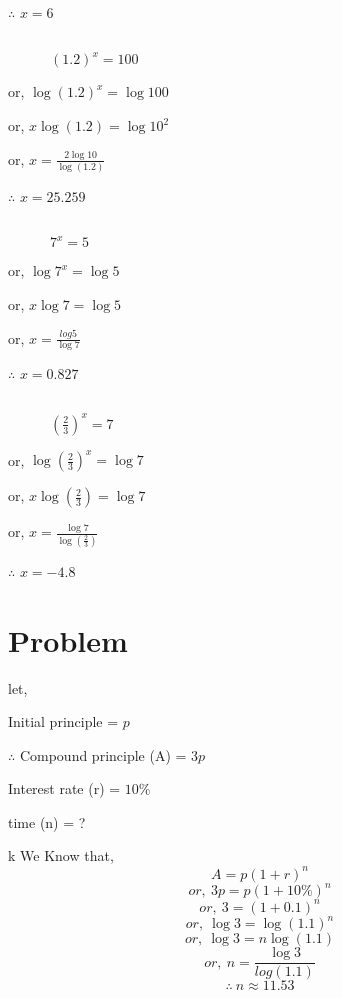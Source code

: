 \documentclass{report}
\begin{document}
$\therefore$ $x =6$

\subsection{}
$\quad\quad\quad\left(1.2\right)^x = 100$

or, $\log \left(1.2\right)^x = \log100$

or, $x\log \left(1.2\right) = \log 10^2$

or, $x = \frac{2\log10}{\log\left(1.2\right)}$

$\therefore$ $x =25.259$

\subsection{}
$\quad\quad\quad7^x = 5$

or, $\log 7^x = \log5$

or, $x\log 7 = \log 5$

or, $x = \frac{log5}{\log7}$

$\therefore$ $x =0.827$

\subsection{}
$\quad\quad\quad\left(\frac{2}{3}\right)^x = 7$

or, $\log \left(\frac{2}{3}\right)^x = \log7$

or, $x\log \left(\frac{2}{3}\right) = \log 7$

or, $x = \frac{\log7}{\log\left(\frac{2}{3}\right)}$

$\therefore$ $x =-4.8$

\section{Problem}

let,

Initial principle = $p$

$\therefore$ Compound principle (A) = $3p $

Interest rate (r) = $10\%$

time (n) = ?

\hspace{30cm}
k We Know that,
$$A = p\left(1+r\right)^{n}$$
$$ or,\: 3p = p\left(1+10\%\right)^{n}$$
$$ or,\: 3  = \left(1+0.1 \right)^{n}$$
$$ or,\: \log{3}  = \log{\left(1.1 \right)}^{n}$$
$$ or,\: \log{3}  = n\log{\left(1.1 \right)}$$
$$ or,\: n  = \frac{\log{3}}{log{\left(1.1 \right)}}$$
$$\therefore \: n \approx 11.53 $$
\end{document}
